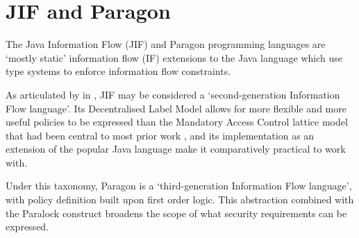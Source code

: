 \chapter{JIF and Paragon} \label{chap_jif_para}

The Java Information Flow (JIF) and Paragon programming languages are `mostly static' information flow (IF) extensions to the Java language which use type systems to enforce information flow constraints.

As articulated by \citeauthor{broberg2013paragon} in  \cite{broberg2013paragon}, JIF may be considered a `second-generation Information Flow language'. Its Decentralised Label Model allows for more flexible and more useful policies to be expressed than the Mandatory Access Control lattice model that had been central to most prior work \cite{denning1977certification}, and its implementation as an extension of the popular Java language make it comparatively practical to work with.

Under this taxonomy, Paragon is a `third-generation Information Flow language', with policy definition built upon first order logic. This abstraction combined with the Paralock construct broadens the scope of what security requirements can be expressed.


\newpage



\newpage

